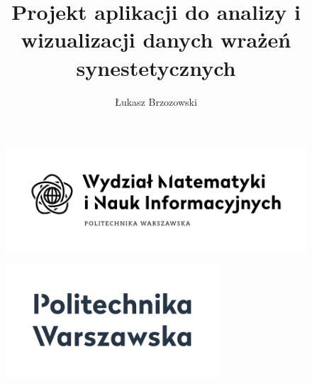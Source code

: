 \documentclass[12pt]{article}
\begin{document}
\title{Projekt aplikacji do analizy i wizualizacji danych wrażeń synestetycznych}
\author{Łukasz Brzozowski}
\maketitle
\begin{figure}[ht!]
	\centering
	\includegraphics[width=\textwidth]{MiNI.png}
\end{figure}
\begin{figure}[ht!]
	\centering
	\includegraphics[width=8cm]{Pw.png}
\end{figure}
\pagebreak
\end{document}
